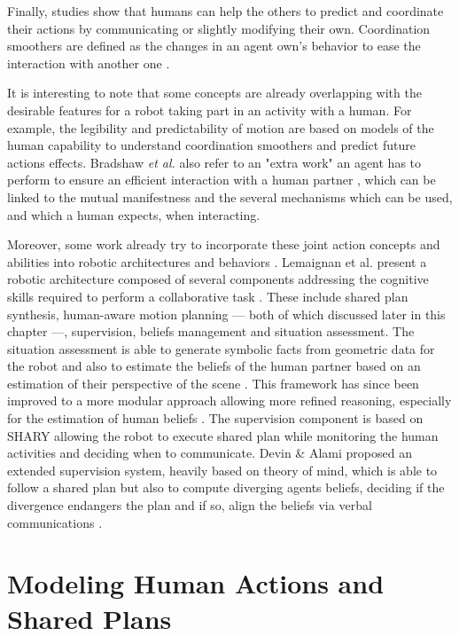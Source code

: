\documentclass[a4paper,11pt,twoside]{StyleThese}
\begin{document}
Finally, studies show that humans can help the others to predict and coordinate their actions by communicating or slightly modifying their own. Coordination smoothers are defined as the changes in an agent own's behavior to ease the interaction with another one \cite{vesper_minimal_2010}.

It is interesting to note that some concepts are already overlapping with the desirable features for a robot taking part in an activity with a human. For example, the legibility and predictability of motion are based on models of the human capability to understand coordination smoothers and predict future actions effects. Bradshaw \textit{et al.} also refer to an "extra work" an agent has to perform to ensure an efficient interaction with a human partner \cite{bradshaw2003adjustable}, which can be linked to the mutual manifestness and the several mechanisms which can be used, and which a human expects, when interacting.

Moreover, some work already try to incorporate these joint action concepts and abilities into robotic architectures and behaviors \cite{khamassi2016integration, clodic2017key}. Lemaignan et al. present a robotic architecture composed of several components addressing the cognitive skills required to perform a collaborative task \cite{lemaignan2017artificial}. These include shared plan synthesis, human-aware motion planning --- both of which discussed later in this chapter ---, supervision, beliefs management and situation assessment. The situation assessment is able to generate symbolic facts from geometric data for the robot and also to estimate the beliefs of the human partner based on an estimation of their perspective of the scene \cite{milliez2014framework}. This framework has since been improved to a more modular approach allowing more refined reasoning, especially for the estimation of human beliefs \cite{lemaignan2018underworlds}. The supervision component is based on SHARY \cite{clodic2009shary} allowing the robot to execute shared plan while monitoring the human activities and deciding when to communicate. Devin \& Alami proposed an extended supervision system, heavily based on theory of mind, which is able to follow a shared plan but also to compute diverging agents beliefs, deciding if the divergence endangers the plan and if so, align the beliefs via verbal communications \cite{devin2016implemented}.

\section{Modeling Human Actions and Shared Plans}
\end{document}
